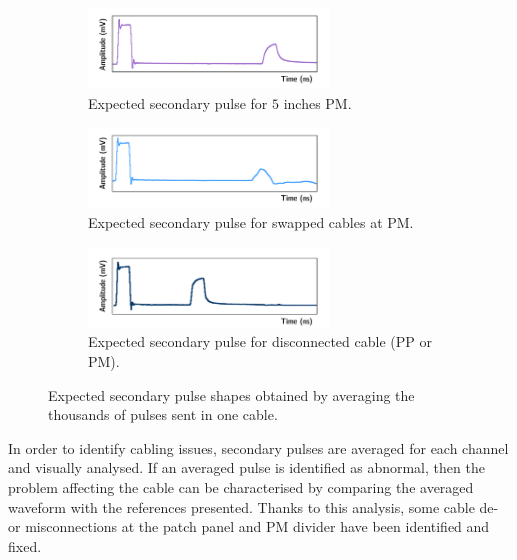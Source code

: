 \begin{figure}[h!]
  \centering
  \begin{subfigure}[b]{1\textwidth}
    \centering
    \includegraphics[width=0.7\textwidth]{commissioning/fig_commissioning/normal_pulse_5.pdf}
    \captionsetup{justification=centering}
    \caption{Expected secondary pulse for $5$ inches PM.
      \label{subfig:normal_5}}
  \end{subfigure}
  \begin{subfigure}[b]{1\textwidth}
    \centering
    \includegraphics[width=0.7\textwidth]{commissioning/fig_commissioning/anormal_pulse.pdf}
    \captionsetup{justification=centering}
    \caption{Expected secondary pulse for swapped cables at PM.
      \label{subfig:}}
  \end{subfigure}
  \begin{subfigure}[b]{1\textwidth}
    \centering
    \includegraphics[width=0.7\textwidth]{commissioning/fig_commissioning/anormal_pulse_misco.pdf}
    \captionsetup{justification=centering}
    \caption{Expected secondary pulse for disconnected cable (PP or PM).
      \label{subfig:}}
  \end{subfigure}
  \caption{Expected secondary pulse shapes obtained by averaging the thousands of pulses sent in one cable.
    \label{fig:}}
\end{figure}

In order to identify cabling issues, secondary pulses are averaged for each channel and visually analysed.
If an averaged pulse is identified as abnormal, then the problem affecting the cable can be characterised by comparing the averaged waveform with the references presented.
Thanks to this analysis, some cable de- or misconnections at the patch panel and PM divider have been identified and fixed.


